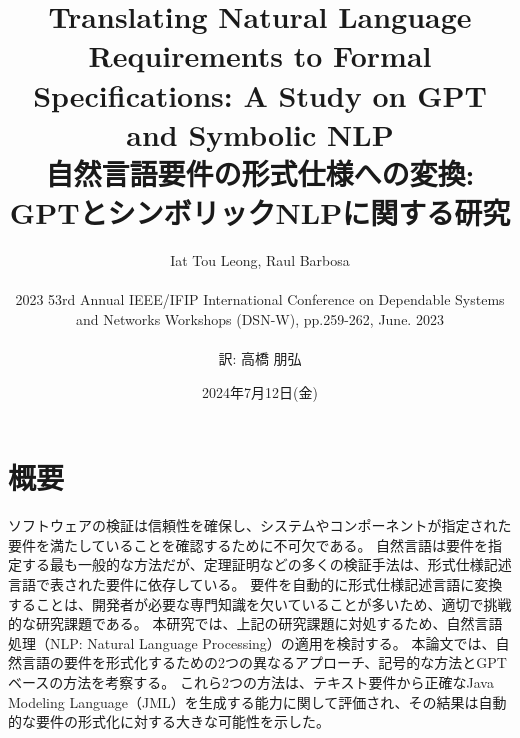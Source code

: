 \documentclass[uplatex, twocolumn,10pt]{jsarticle} %
\begin{document}
\title{Translating Natural Language Requirements to Formal Specifications: A Study on GPT and Symbolic NLP \\
    自然言語要件の形式仕様への変換: GPTとシンボリックNLPに関する研究}
\author{Iat Tou Leong,  Raul Barbosa \\\\
    2023 53rd Annual IEEE/IFIP International Conference on Dependable Systems\\ and Networks Workshops (DSN-W), pp.259-262, June. 2023\\\\ 訳: 高橋 朋弘}
\date{2024年7月12日(金)}
\maketitle

\section*{概要} %
ソフトウェアの検証は信頼性を確保し、システムやコンポーネントが指定された要件を満たしていることを確認するために不可欠である。
自然言語は要件を指定する最も一般的な方法だが、定理証明などの多くの検証手法は、形式仕様記述言語で表された要件に依存している。
要件を自動的に形式仕様記述言語に変換することは、開発者が必要な専門知識を欠いていることが多いため、適切で挑戦的な研究課題である。
本研究では、上記の研究課題に対処するため、自然言語処理（NLP: Natural Language Processing）の適用を検討する。
本論文では、自然言語の要件を形式化するための2つの異なるアプローチ、記号的な方法とGPTベースの方法を考察する。
これら2つの方法は、テキスト要件から正確なJava Modeling Language（JML）を生成する能力に関して評価され、その結果は自動的な要件の形式化に対する大きな可能性を示した。

\end{document}
